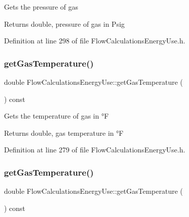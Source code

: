 Gets the pressure of gas

\begin{DoxyReturn}{Returns}
double, pressure of gas in Psig 
\end{DoxyReturn}


Definition at line 298 of file Flow\+Calculations\+Energy\+Use.\+h.

\mbox{\label{class_flow_calculations_energy_use_a9d5782d594530c0345ac3c8faff252b3}} 
\subsubsection{\texorpdfstring{get\+Gas\+Temperature()}{getGasTemperature()}\hspace{0.1cm}{\footnotesize\ttfamily [1/3]}}
{\footnotesize\ttfamily double Flow\+Calculations\+Energy\+Use\+::get\+Gas\+Temperature (\begin{DoxyParamCaption}{ }\end{DoxyParamCaption}) const\hspace{0.3cm}{\ttfamily [inline]}}

Gets the temperature of gas in °F

\begin{DoxyReturn}{Returns}
double, gas temperature in °F 
\end{DoxyReturn}


Definition at line 279 of file Flow\+Calculations\+Energy\+Use.\+h.

\mbox{\label{class_flow_calculations_energy_use_a9d5782d594530c0345ac3c8faff252b3}} 
\subsubsection{\texorpdfstring{get\+Gas\+Temperature()}{getGasTemperature()}\hspace{0.1cm}{\footnotesize\ttfamily [2/3]}}
{\footnotesize\ttfamily double Flow\+Calculations\+Energy\+Use\+::get\+Gas\+Temperature (\begin{DoxyParamCaption}{ }\end{DoxyParamCaption}) const\hspace{0.3cm}{\ttfamily [inline]}}


